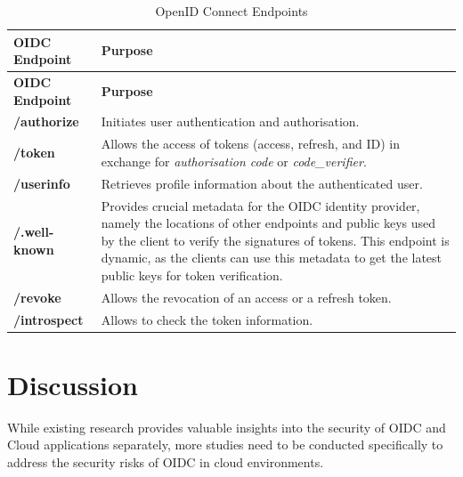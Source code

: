 \begin{itemize}
    
    
    \begin{longtable}{|>{\raggedright\arraybackslash}p{4cm}|>{\raggedright\arraybackslash}p{11cm}|}
    \caption{OpenID Connect Endpoints}
    \label{table:outh_endpoints}
    \hline
    \rowcolor{grey!15}
    \textbf{OIDC Endpoint} & \textbf{Purpose} \\ \hline
    \endfirsthead
    \hline
    \rowcolor{grey!15}
    \textbf{OIDC Endpoint} & \textbf{Purpose} \\ \hline
    \endhead
    \hline 
    \endfoot
    \hline
    \endlastfoot
   \textbf{/authorize} & Initiates user authentication and authorisation. \\ \hline

    \textbf{/token} & Allows the access of tokens (access, refresh, and ID) in exchange for \textit{authorisation code} or \textit{code\_verifier}.\\ \hline
    
    \textbf{/userinfo} & Retrieves profile information about the authenticated user. \\ \hline
    
    \textbf{/.well-known} & Provides crucial metadata for the OIDC identity provider, namely the locations of other endpoints and public keys used by the client to verify the signatures of tokens. This endpoint is dynamic, as the clients can use this metadata to get the latest public keys for token verification. \\ \hline
    
    \textbf{/revoke} & Allows the revocation of an access or a refresh token. \\ \hline

    \textbf{/introspect} & Allows to check the token information. \\ \hline
        
    \end{longtable}
    





\section{Discussion}

While existing research provides valuable insights into the security of OIDC and Cloud applications separately, more studies need to be conducted specifically to address the security risks of OIDC in cloud environments. 


\end{itemize}
